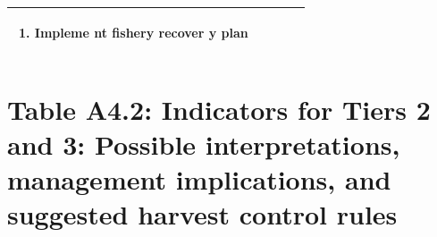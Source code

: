 \documentclass[]{book}
\providecommand{\tightlist}{%
  \setlength{\itemsep}{0pt}\setlength{\parskip}{0pt}}
\begin{document}
\begin{longtable}[]{@{}lllll@{}}
\begin{minipage}[t]{0.19\columnwidth}
\begin{enumerate}
\def\labelenumi{\arabic{enumi}.}
\tightlist
\item
  Impleme nt fishery recover y plan
\end{enumerate}\strut
\end{minipage}\tabularnewline
\bottomrule
\end{longtable}

\section{Table A4.2: Indicators for Tiers 2 and 3: Possible
interpretations, management implications, and suggested harvest control
rules}\label{table-a4.2-indicators-for-tiers-2-and-3-possible-interpretations-management-implications-and-suggested-harvest-control-rules}
\end{document}
